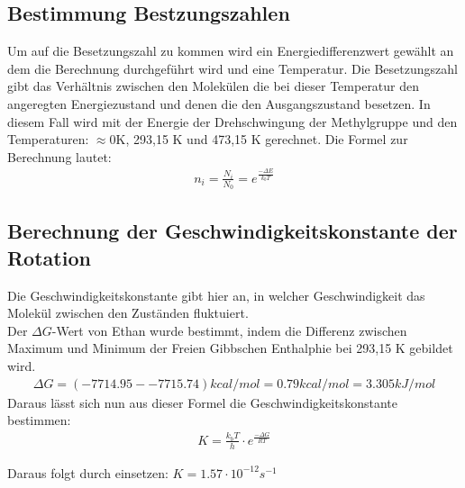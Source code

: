 \subsection{Bestimmung Bestzungszahlen}

Um auf die Besetzungszahl zu kommen wird ein Energiedifferenzwert gewählt an dem die Berechnung durchgeführt wird und eine Temperatur. Die Besetzungszahl gibt das Verhältnis zwischen den Molekülen die bei dieser Temperatur den angeregten Energiezustand und denen die den Ausgangszustand besetzen.
In diesem Fall wird mit der Energie der Drehschwingung der Methylgruppe und den Temperaturen: $\approx$0K, 293,15 K und 473,15 K gerechnet.
Die Formel zur Berechnung lautet:
\begin{align}
    n_i = \frac{N_i}{N_0} = e^{\frac{-\Delta E}{k_b T}}
\end{align}


\subsection{Berechnung der Geschwindigkeitskonstante der Rotation}

Die Geschwindigkeitskonstante gibt hier an, in welcher Geschwindigkeit das Molekül zwischen den Zuständen fluktuiert. \\
Der $\Delta G$-Wert von Ethan wurde bestimmt, indem die Differenz zwischen Maximum und Minimum der Freien Gibbschen Enthalphie bei 293,15 K gebildet wird.
\begin{align*}
    \Delta G = (-7714.95 - -7715.74) kcal/mol = 0.79 kcal/mol = 3.305 kJ/mol  
\end{align*}
Daraus lässt sich nun aus dieser Formel die Geschwindigkeitskonstante bestimmen:
\begin{align}
    K = \frac{k_b T}{h} \cdot e^{\frac{- \Delta G}{RT}}
\end{align}

Daraus folgt durch einsetzen: $K = 1.57 \cdot 10^{-12} s^{-1}$
